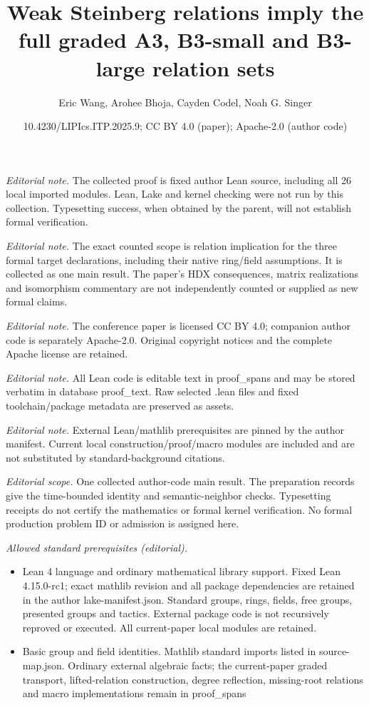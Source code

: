\documentclass[10pt,a4paper]{article}
\title{Weak Steinberg relations imply the full graded A3, B3-small and B3-large relation sets}
\author{Eric Wang, Arohee Bhoja, Cayden Codel, Noah G. Singer}
\date{10.4230/LIPIcs.ITP.2025.9; CC BY 4.0 (paper); Apache-2.0 (author code)}
\begin{document}
\maketitle
\noindent\textit{Editorial note.} The collected proof is fixed author Lean source, including all 26 local imported modules. Lean, Lake and kernel checking were not run by this collection. Typesetting success, when obtained by the parent, will not establish formal verification.\par\medskip
\noindent\textit{Editorial note.} The exact counted scope is relation implication for the three formal target declarations, including their native ring/field assumptions. It is collected as one main result. The paper’s HDX consequences, matrix realizations and isomorphism commentary are not independently counted or supplied as new formal claims.\par\medskip
\noindent\textit{Editorial note.} The conference paper is licensed CC BY 4.0; companion author code is separately Apache-2.0. Original copyright notices and the complete Apache license are retained.\par\medskip
\noindent\textit{Editorial note.} All Lean code is editable text in proof\_spans and may be stored verbatim in database proof\_text. Raw selected .lean files and fixed toolchain/package metadata are preserved as assets.\par\medskip
\noindent\textit{Editorial note.} External Lean/mathlib prerequisites are pinned by the author manifest. Current local construction/proof/macro modules are included and are not substituted by standard-background citations.\par\medskip
\noindent\textit{Editorial scope.} One collected author-code main result. The preparation records give the time-bounded identity and semantic-neighbor checks. Typesetting receipts do not certify the mathematics or formal kernel verification. No formal production problem ID or admission is assigned here.\par\medskip
\noindent\textit{Allowed standard prerequisites (editorial).}\begin{itemize}
\item Lean 4 language and ordinary mathematical library support. Fixed Lean 4.15.0-rc1; exact mathlib revision and all package dependencies are retained in the author lake-manifest.json. Standard groups, rings, fields, free groups, presented groups and tactics. External package code is not recursively reproved or executed. All current-paper local modules are retained.
\item Basic group and field identities. Mathlib standard imports listed in source-map.json. Ordinary external algebraic facts; the current-paper graded transport, lifted-relation construction, degree reflection, missing-root relations and macro implementations remain in proof\_spans
\end{itemize}\medskip
\end{document}
